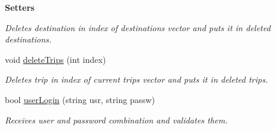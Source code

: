 \begin{Indent}{\bf Setters}
\begin{DoxyCompactItemize}
\begin{DoxyCompactList}\small\item\em Deletes destination in index of destinations vector and puts it in deleted destinations. \end{DoxyCompactList}\item 
void \hyperlink{class_logic_a238109760ceaa4cfc8aa6d52398b192d}{delete\+Trips} (int index)
\begin{DoxyCompactList}\small\item\em Deletes trip in index of current trips vector and puts it in deleted trips. \end{DoxyCompactList}\item 
bool \hyperlink{class_logic_a3279f61ab5921d7a52d327cf4cc4c12c}{user\+Login} (string usr, string passw)
\begin{DoxyCompactList}\small\item\em Receives user and password combination and validates them. \end{DoxyCompactList}\end{DoxyCompactItemize}
\end{Indent}
